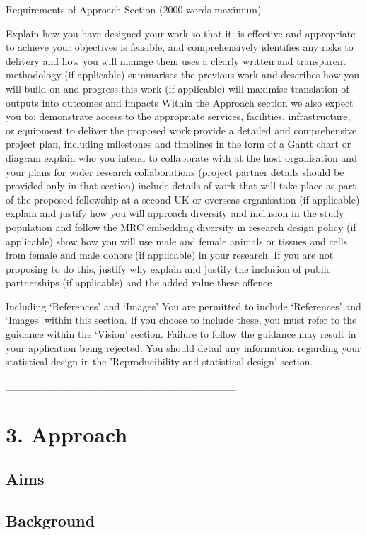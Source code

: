 Requirements of Approach Section (2000 words maximum)

Explain how you have designed your work so that it:
is effective and appropriate to achieve your objectives
is feasible, and comprehensively identifies any risks to delivery and how you will manage them
uses a clearly written and transparent methodology (if applicable)
summarises the previous work and describes how you will build on and progress this work (if applicable)
will maximise translation of outputs into outcomes and impacts
Within the Approach section we also expect you to:
demonstrate access to the appropriate services, facilities, infrastructure, or equipment to deliver the proposed work
provide a detailed and comprehensive project plan, including milestones and timelines in the form of a Gantt chart or diagram
explain who you intend to collaborate with at the host organisation and your plans for wider research collaborations (project partner details should be provided only in that section)
include details of work that will take place as part of the proposed fellowship at a second UK or overseas organisation (if applicable)
explain and justify how you will approach diversity and inclusion in the study population and follow the MRC embedding diversity in research design policy (if applicable)
show how you will use male and female animals or tissues and cells from female and male donors (if applicable) in your research. If you are not proposing to do this, justify why
explain and justify the inclusion of public partnerships (if applicable) and the added value these offence

Including ‘References’ and ‘Images’
You are permitted to include ‘References’ and ‘Images’ within this section. If you choose to include these, you must refer to the guidance within the ‘Vision’ section. Failure to follow the guidance may result in your application being rejected.
You should detail any information regarding your statistical design in the 'Reproducibility and statistical design' section.


_______________________________

\section*{3. Approach}
\subsection*{Aims}


\subsection*{Background}



